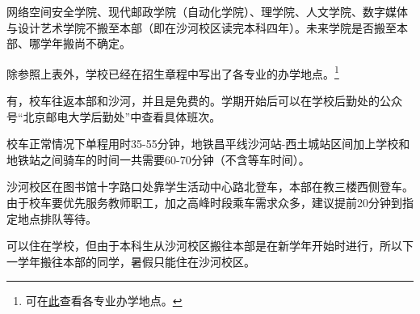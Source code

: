 网络空间安全学院、现代邮政学院（自动化学院）、理学院、人文学院、数字媒体与设计艺术学院不搬至本部（即在沙河校区读完本科四年）。未来学院是否搬至本部、哪学年搬尚不确定。

除参照上表外，学校已经在招生章程中写出了各专业的办学地点。\footnote{可在\href{https://zsb.bupt.edu.cn/info/1005/1992.htm}{此}查看各专业办学地点。}


有，校车往返本部和沙河，并且是免费的。学期开始后可以在学校后勤处的公众号“北京邮电大学后勤处”中查看具体班次。

校车正常情况下单程用时35-55分钟，地铁昌平线沙河站-西土城站区间加上学校和地铁站之间骑车的时间一共需要60-70分钟（不含等车时间）。

沙河校区在图书馆十字路口处靠学生活动中心路北登车，本部在教三楼西侧登车。由于校车要优先服务教师职工，加之高峰时段乘车需求众多，建议提前20分钟到指定地点排队等待。


可以住在学校，但由于本科生从沙河校区搬往本部是在新学年开始时进行，所以下一学年搬往本部的同学，暑假只能住在沙河校区。
